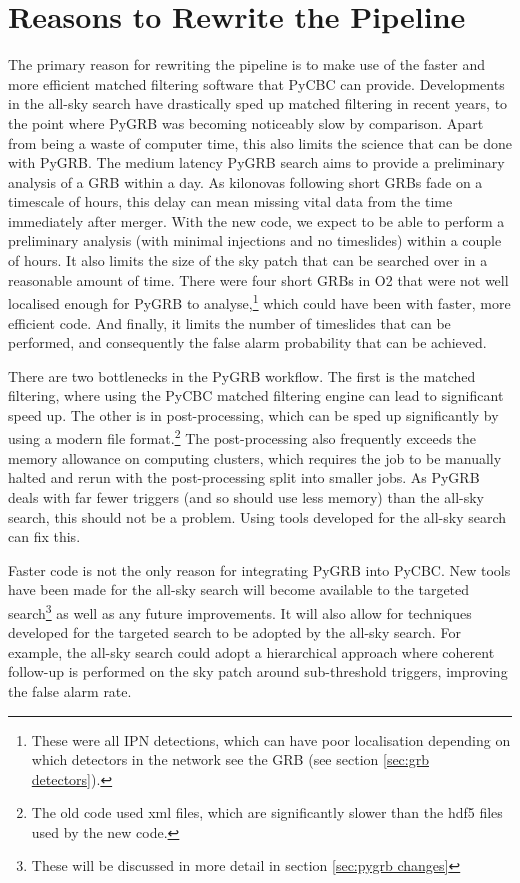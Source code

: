 \documentclass[11pt]{cuthesis}
\begin{document}
\section{Reasons to Rewrite the Pipeline}
The primary reason for rewriting the pipeline is to make use of the faster and more efficient matched filtering software that PyCBC can provide. Developments in the all-sky search have drastically sped up matched filtering in recent years, to the point where PyGRB was becoming noticeably slow by comparison. Apart from being a waste of computer time, this also limits the science that can be done with PyGRB. The medium latency PyGRB search aims to provide a preliminary analysis of a GRB within a day. As kilonovas following short GRBs fade on a timescale of hours, this delay can mean missing vital data from the time immediately after merger. With the new code, we expect to be able to perform a preliminary analysis (with minimal injections and no timeslides) within a couple of hours. It also limits the size of the sky patch that can be searched over in a reasonable amount of time. There were four short GRBs in O2 that were not well localised enough for PyGRB to analyse,\footnote{These were all IPN detections, which can have poor localisation depending on which detectors in the network see the GRB (see section \ref{sec:grb detectors}).} which could have been with faster, more efficient code. And finally, it limits the number of timeslides that can be performed, and consequently the false alarm probability that can be achieved. 

There are two bottlenecks in the PyGRB workflow. The first is the matched filtering, where using the PyCBC matched filtering engine can lead to significant speed up. The other is in post-processing, which can be sped up significantly by using a modern file format.\footnote{The old code used xml files, which are significantly slower than the hdf5 files used by the new code.} The post-processing also frequently exceeds the memory allowance on computing clusters, which requires the job to be manually halted and rerun with the post-processing split into smaller jobs. As PyGRB deals with far fewer triggers (and so should use less memory) than the all-sky search, this should not be a problem. Using tools developed for the all-sky search can fix this. 

Faster code is not the only reason for integrating PyGRB into PyCBC. New tools have been made for the all-sky search will become available to the targeted search\footnote{These will be discussed in more detail in section \ref{sec:pygrb changes}} as well as any future improvements. It will also allow for techniques developed for the targeted search to be adopted by the all-sky search. For example, the all-sky search could adopt a hierarchical approach where coherent follow-up is performed on the sky patch around sub-threshold triggers, improving the false alarm rate.  
\end{document}
